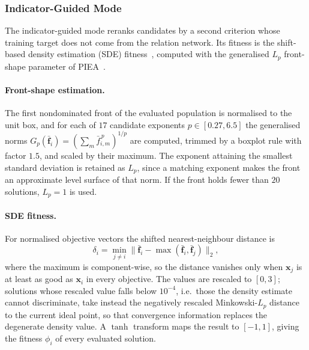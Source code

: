 \documentclass[11pt,a4paper]{article}
\newcommand{\vf}{\mathbf{f}}
\newcommand{\vx}{\mathbf{x}}
\begin{document}
\subsubsection{Indicator-Guided Mode}
\label{sec:method:candidate:ind}

The indicator-guided mode reranks candidates by a second criterion whose training
target does not come from the relation network. Its fitness is the shift-based
density estimation (SDE) fitness~\cite{ref:sde}, computed with the generalised
$L_p$ front-shape parameter of PIEA~\cite{ref:piea}.

\paragraph{Front-shape estimation.}
The first nondominated front of the evaluated population is normalised to the
unit box, and for each of $17$ candidate exponents
$p\in[0.27,6.5]$ the generalised norms
$G_p(\bar{\vf}_i)=(\sum_m\bar f_{i,m}^{\,p})^{1/p}$ are computed, trimmed by a
boxplot rule with factor $1.5$, and scaled by their maximum. The exponent
attaining the smallest standard deviation is retained as $L_p$, since a matching
exponent makes the front an approximate level surface of that norm. If the front
holds fewer than $20$ solutions, $L_p=1$ is used.

\paragraph{SDE fitness.}
For normalised objective vectors the shifted nearest-neighbour distance is
\begin{equation}
\delta_i=\min_{j\neq i}
\bigl\|\bar{\vf}_i-\max(\bar{\vf}_i,\bar{\vf}_j)\bigr\|_2 ,
\label{eq:sde}
\end{equation}
where the maximum is component-wise, so the distance vanishes only when $\vx_j$
is at least as good as $\vx_i$ in every objective. The values are rescaled to
$[0,3]$; solutions whose rescaled value falls below $10^{-4}$, i.e.\ those the
density estimate cannot discriminate, take instead the negatively rescaled
Minkowski-$L_p$ distance to the current ideal point, so that convergence
information replaces the degenerate density value. A $\tanh$ transform maps the
result to $[-1,1]$, giving the fitness $\phi_i$ of every evaluated solution.
\end{document}
